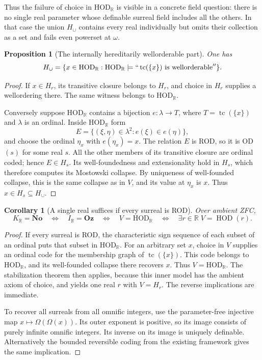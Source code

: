 \documentclass[11pt,a4paper]{article}
\numberwithin{equation}{section}
\newtheorem{proposition}[proposition]{Proposition}
\newtheorem{corollary}[corollary]{Corollary}
\theoremstyle{definition}
\theoremstyle{remark}
\newcommand{\No}{\mathbf{No}}
\newcommand{\Oz}{\mathbf{Oz}}
\newcommand{\HOD}{\mathrm{HOD}}
\newcommand{\R}{\mathbb R}
\newcommand{\HR}{\HOD_{\R}}
\newcommand{\KR}{K_{\R}}
\newcommand{\IR}{I_{\R}}
\newcommand{\Hcup}{H_{\cup}}
\begin{document}
Thus the failure of choice in $\HR$ is visible in a concrete
field question: there is no single real parameter whose definable
surreal field includes all the others.  In that case the union
$\Hcup$ contains every real individually but omits their
collection as a set and fails even powerset at $\omega$.

\begin{proposition}[The internally hereditarily wellorderable part]
\label{dsn:rp:prop:hereditary-wellorder}
One has
\[
 \Hcup
 =\{x\in \HR:
     \HR\models
       ``\operatorname{tc}(\{x\})\text{ is wellorderable}''\}.
\]
\end{proposition}
\begin{proof}
If $x\in H_r$, its transitive closure belongs to $H_r$, and choice in
$H_r$ supplies a wellordering there.  The same witness belongs to
$\HR$.

Conversely suppose $\HR$ contains a bijection
$e:\lambda\to T$, where $T=\operatorname{tc}(\{x\})$ and $\lambda$
is an ordinal.  Inside $\HR$ form
\[
 E=\{(\xi,\eta)\in\lambda^2:e(\xi)\in e(\eta)\},
\]
and choose the ordinal $\eta_x$ with $e(\eta_x)=x$.  The relation $E$
is ROD, so it is OD$(s)$ for some real $s$.  All the other members of
its transitive closure are ordinal coded; hence $E\in H_s$.  Its
well-foundedness and extensionality hold in $H_s$, which therefore
computes its Mostowski collapse.  By uniqueness of well-founded
collapse, this is the same collapse as in $V$, and its value at
$\eta_x$ is $x$.  Thus $x\in H_s\subseteq \Hcup$.
\end{proof}

\begin{corollary}[A single real suffices if every surreal is ROD]
\label{dsn:rp:cor:global-single-real}
Over ambient ZFC,
\[
 \KR=\No
 \quad\Longleftrightarrow\quad \IR=\Oz
 \quad\Longleftrightarrow\quad V=\HR
 \quad\Longleftrightarrow\quad
 \exists r\in\mathbb R\;V=\operatorname{HOD}(r).
\]
\end{corollary}
\begin{proof}
If every surreal is ROD, the characteristic sign sequence of each
subset of an ordinal puts that subset in $\HR$.  For an
arbitrary set $x$, choice in $V$ supplies an ordinal code for the
membership graph of $\operatorname{tc}(\{x\})$.  This code belongs
to $\HR$, and its well-founded collapse there recovers $x$.
Thus $V=\HR$.  The stabilization theorem then applies,
because this inner model has the ambient axiom of choice, and yields
one real $r$ with $V=H_r$.  The reverse implications are immediate.

To recover all surreals from all omnific integers, use the
parameter-free injective map $x\mapsto\Omega(\Omega(x))$.  Its outer
exponent is positive, so its image consists of purely infinite
omnific integers.  Its inverse on its image is uniquely definable.
Alternatively the bounded reversible coding from the existing
framework gives the same implication.
\end{proof}
\end{document}
